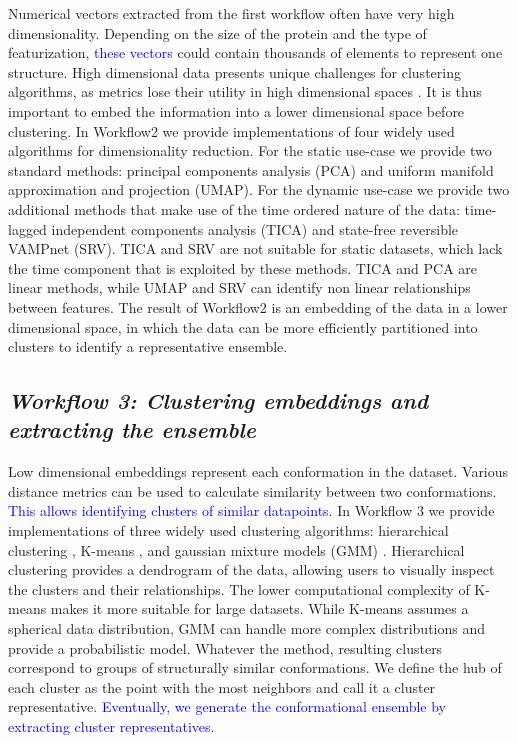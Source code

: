 \documentclass[unnumsec,webpdf,contemporary,large,numsquare]{oup-authoring-template}%
\theoremstyle{thmstyleone}%
\theoremstyle{thmstyletwo}%
\theoremstyle{thmstylethree}%
\begin{document}
Numerical vectors extracted from the first workflow often have very high dimensionality. Depending on the size of the protein and the type of featurization, \textcolor{blue}{these vectors} could contain thousands of elements to represent one structure. High dimensional data presents unique challenges for clustering algorithms, as metrics lose their utility in high dimensional spaces \textcolor{blue}{\citep{novinskaya_improving_2015}.} It is thus important to embed the information into a lower dimensional space before clustering. In Workflow2 we provide implementations of four widely used algorithms for dimensionality reduction. For the static use-case we provide two standard methods: principal components analysis (PCA) and uniform manifold approximation and projection (UMAP). For the dynamic use-case we provide two additional methods that make use of the time ordered nature of the data: time-lagged independent components analysis (TICA) and state-free reversible VAMPnet (SRV).  TICA and SRV are not suitable for static datasets, which lack the time component that is exploited by these methods. TICA and PCA are linear methods, while UMAP and SRV can identify non linear relationships between features. The result of Workflow2 is an embedding of the data in a lower dimensional space, in which the data can be more efficiently partitioned into clusters to identify a representative ensemble.

\subsection{\textit{\textbf{Workflow 3:} Clustering embeddings and extracting the ensemble}}\label{wf1}

Low dimensional embeddings represent each conformation in the dataset. Various distance metrics can be used to calculate similarity between two conformations. \textcolor{blue}{This allows identifying clusters of similar datapoints.} In Workflow 3 we provide implementations of three widely used clustering algorithms: hierarchical clustering \citep{murtagh_algorithms_2012}, K-means \citep{hartigan_algorithm_1979}, and  gaussian mixture models (GMM) \citep{lindsay_mixture_1989}. Hierarchical clustering provides a dendrogram of the data, allowing users to visually inspect the clusters and their relationships. The lower computational complexity of K-means makes it more suitable for large datasets. While K-means assumes a spherical data distribution, GMM can handle more complex distributions and provide a probabilistic model. Whatever the method, resulting clusters correspond to groups of structurally similar conformations. We define the hub of each cluster as the point with the most neighbors and call it a cluster representative. \textcolor{blue}{Eventually, we generate the conformational ensemble by extracting cluster representatives.}
\end{document}
